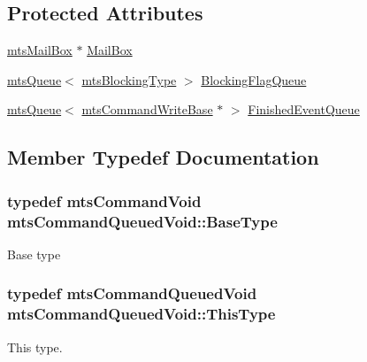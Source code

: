 \subsection*{Protected Attributes}
\begin{DoxyCompactItemize}
\item 
\hyperlink{classmts_mail_box}{mts\+Mail\+Box} $\ast$ \hyperlink{classmts_command_queued_void_a44473994b2785131ab7c0f9974858ff0}{Mail\+Box}
\item 
\hyperlink{classmts_queue}{mts\+Queue}$<$ \hyperlink{mts_forward_declarations_8h_ad7426ccb6c883bc780d0ee197dddcbe7}{mts\+Blocking\+Type} $>$ \hyperlink{classmts_command_queued_void_aefa9eea10dadece42a79902c0e3dc50f}{Blocking\+Flag\+Queue}
\item 
\hyperlink{classmts_queue}{mts\+Queue}$<$ \hyperlink{classmts_command_write_base}{mts\+Command\+Write\+Base} $\ast$ $>$ \hyperlink{classmts_command_queued_void_a292d6fd53236a3143e1182f248d1621d}{Finished\+Event\+Queue}
\end{DoxyCompactItemize}


\subsection{Member Typedef Documentation}
\hypertarget{classmts_command_queued_void_a5e83cb9e30b4d01f5e133d2e809a7379}{}
\subsubsection[{Base\+Type}]{\setlength{\rightskip}{0pt plus 5cm}typedef {\bf mts\+Command\+Void} {\bf mts\+Command\+Queued\+Void\+::\+Base\+Type}}\label{classmts_command_queued_void_a5e83cb9e30b4d01f5e133d2e809a7379}
Base type \hypertarget{classmts_command_queued_void_a2bce402cdb87e0eeff9903a19a48b630}{}
\subsubsection[{This\+Type}]{\setlength{\rightskip}{0pt plus 5cm}typedef {\bf mts\+Command\+Queued\+Void} {\bf mts\+Command\+Queued\+Void\+::\+This\+Type}}\label{classmts_command_queued_void_a2bce402cdb87e0eeff9903a19a48b630}
This type. 

